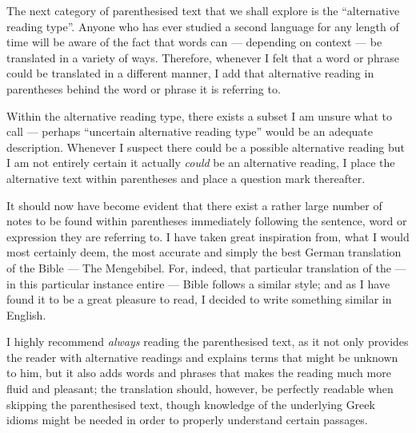 The next category of parenthesised text that we shall explore is the ``alternative reading type''. Anyone who has ever studied a second language for any length of time will be aware of the fact that words can — depending on context — be translated in a variety of ways. Therefore, whenever I felt that a word or phrase could be translated in a different manner, I add that alternative reading in parentheses behind the word or phrase it is referring to. 

Within the alternative reading type, there exists a subset I am unsure what to call — perhaps ``uncertain alternative reading type'' would be an adequate description. Whenever I suspect there could be a possible alternative reading but I am not entirely certain it actually \textit{could} be an alternative reading, I place the alternative text within parentheses and place a question mark thereafter. 

It should now have become evident that there exist a rather large number of notes to be found within parentheses immediately following the sentence, word or expression they are referring to. I have taken great inspiration from, what I would most certainly deem, the most accurate and simply the best German translation of the Bible — The Mengebibel. For, indeed, that particular translation of the — in this particular instance entire — Bible follows a similar style; and as I have found it to be a great pleasure to read, I decided to write something similar in English. 

I highly recommend \textit{always} reading the parenthesised text, as it not only provides the reader with alternative readings and explains terms that might be unknown to him, but it also adds words and phrases that makes the reading much more fluid and pleasant; the translation should, however, be perfectly readable when skipping the parenthesised text, though knowledge of the underlying Greek idioms might be needed in order to properly understand certain passages. 